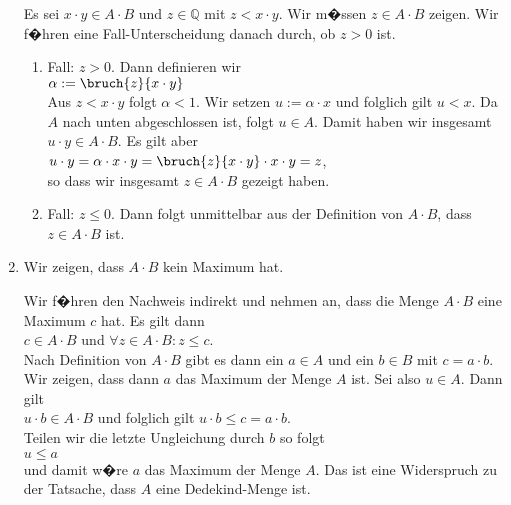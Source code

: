 \begin{enumerate}
      Es sei $x \cdot y \in A \cdot B$ und $z \in \mathbb{Q}$ mit $z < x \cdot y$.  
      Wir m�ssen $z \in A \cdot B$ zeigen.  
      Wir f�hren eine Fall-Unterscheidung danach durch, ob $z > 0$ ist.
      \begin{enumerate}
      \item Fall: $z > 0$.  Dann definieren wir
            \\[0.2cm]
            \hspace*{1.3cm}
            $\alpha := \bruch{z}{x \cdot y}$
            \\[0.2cm]
            Aus $z < x \cdot y$ folgt $\alpha < 1$.  Wir setzen $u := \alpha \cdot x$
            und folglich gilt $u < x$.  Da $A$ nach unten abgeschlossen ist, folgt $u \in A$.
            Damit haben wir insgesamt $u \cdot y \in A \cdot B$.  Es gilt aber
            \\[0.2cm]
            \hspace*{1.3cm}
            $u \cdot y = \alpha \cdot x \cdot y = \bruch{z}{x \cdot y} \cdot x \cdot y = z$,
            \\[0.2cm]
            so dass wir insgesamt $z \in A \cdot B$ gezeigt haben.
      \item Fall: $z \leq 0$.  Dann folgt unmittelbar aus der Definition von $A \cdot B$, dass 
            $z \in A \cdot B$  ist.
      \end{enumerate}
\item Wir zeigen, dass $A \cdot B$ kein Maximum hat.  

      Wir f�hren den Nachweis indirekt und nehmen an, dass die Menge $A \cdot B$ eine Maximum $c$ hat.
      Es gilt dann 
      \\[0.2cm]
      \hspace*{1.3cm}
      $c \in A \cdot B$ \quad und \quad $\forall z \in A \cdot B: z \leq c$.
      \\[0.2cm]
      Nach Definition von $A \cdot B$ gibt es dann ein $a \in A$ und ein $b \in B$ mit $c = a \cdot b$.
      Wir zeigen, dass dann $a$ das Maximum der Menge $A$ ist.  Sei also $u \in A$.  Dann gilt
      \\[0.2cm]
      \hspace*{1.3cm}
      $u \cdot b \in A \cdot B$ \quad und folglich gilt \quad $u \cdot b \leq c = a \cdot b$.
      \\[0.2cm]
      Teilen wir die letzte Ungleichung durch $b$ so folgt
      \\[0.2cm]
      \hspace*{1.3cm}
      $u \leq a$
      \\[0.2cm]
      und damit w�re $a$ das Maximum der Menge $A$.  Das ist eine Widerspruch zu der Tatsache, dass
      $A$ eine Dedekind-Menge ist.
\end{enumerate}
